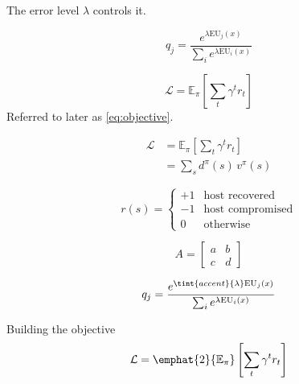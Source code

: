 
The error level $\lambda$ controls it.

\[ q_j = \frac{e^{\lambda \mathrm{EU}_j(x)}}{\sum_i e^{\lambda \mathrm{EU}_i(x)}} \]


\begin{equation}
  \mathcal{L} = \mathbb{E}_{\pi}\left[ \sum_t \gamma^t r_t \right]
  \label{eq:objective}
\end{equation}
Referred to later as \eqref{eq:objective}.

\begin{align*}
  \mathcal{L} &= \mathbb{E}_{\pi}\left[ \sum_t \gamma^t r_t \right] \\
              &= \sum_s d^{\pi}(s) \, v^{\pi}(s)
\end{align*}

\[ r(s) = \begin{cases}
     +1 & \text{host recovered} \\
     -1 & \text{host compromised} \\
      0 & \text{otherwise}
   \end{cases} \]

\[ A = \begin{bmatrix} a & b \\ c & d \end{bmatrix} \]

\[ q_j = \frac{e^{\tint{accent}{\lambda} \mathrm{EU}_j(x)}}
              {\sum_i e^{\lambda \mathrm{EU}_i(x)}} \]

\begin{frame}{Building the objective}
  \[ \mathcal{L} = \emphat{2}{\mathbb{E}_{\pi}}\left[ \sum_t \gamma^t r_t \right] \]
\end{frame}

